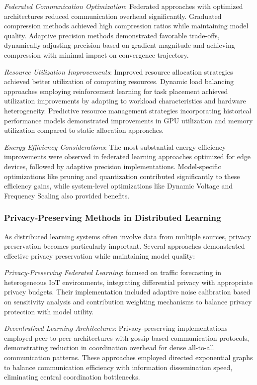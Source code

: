 \documentclass[acmsmall]{acmart}
\begin{document}
\textit{Federated Communication Optimization}: Federated approaches with optimized architectures reduced communication overhead significantly. Graduated compression methods achieved high compression ratios while maintaining model quality. Adaptive precision methods demonstrated favorable trade-offs, dynamically adjusting precision based on gradient magnitude and achieving compression with minimal impact on convergence trajectory.

\textit{Resource Utilization Improvements}: Improved resource allocation strategies achieved better utilization of computing resources. Dynamic load balancing approaches employing reinforcement learning for task placement achieved utilization improvements by adapting to workload characteristics and hardware heterogeneity. Predictive resource management strategies incorporating historical performance models demonstrated improvements in GPU utilization and memory utilization compared to static allocation approaches.

\textit{Energy Efficiency Considerations}: The most substantial energy efficiency improvements were observed in federated learning approaches optimized for edge devices, followed by adaptive precision implementations. Model-specific optimizations like pruning and quantization contributed significantly to these efficiency gains, while system-level optimizations like Dynamic Voltage and Frequency Scaling also provided benefits.

\subsubsection{Privacy-Preserving Methods in Distributed Learning}\label{subsubsec:distributed-computing-approaches-rq21:privacy-preserving-methods-in-distributed-learning}
As distributed learning systems often involve data from multiple sources, privacy preservation becomes particularly important. Several approaches demonstrated effective privacy preservation while maintaining model quality:

\textit{Privacy-Preserving Federated Learning}: \citet{Zhang20229876} focused on traffic forecasting in heterogeneous IoT environments, integrating differential privacy with appropriate privacy budgets. Their implementation included adaptive noise calibration based on sensitivity analysis and contribution weighting mechanisms to balance privacy protection with model utility.

\textit{Decentralized Learning Architectures}: Privacy-preserving implementations employed peer-to-peer architectures with gossip-based communication protocols, demonstrating reduction in coordination overhead for dense all-to-all communication patterns. These approaches employed directed exponential graphs to balance communication efficiency with information dissemination speed, eliminating central coordination bottlenecks.
\end{document}

